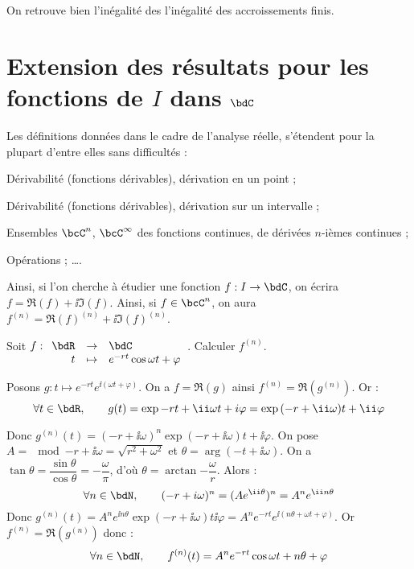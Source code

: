 \documentclass[a4paper,french,bookmarks]{article}
\begin{document}
On retrouve bien l'inégalité des l'inégalité des accroissements finis.
    
\section{Extension des résultats pour les fonctions de $I$ dans $\bdC$}

Les définitions données dans le cadre de l'analyse réelle, s'étendent pour la plupart d'entre elles sans difficultés :

\begin{enumerate}
    \ithand Dérivabilité (fonctions dérivables), dérivation en un point ;
    
    \ithand Dérivabilité (fonctions dérivables), dérivation sur un intervalle ;
    
    \ithand Ensembles $\bcC^n$, $\bcC^\infty$ des fonctions continues, de dérivées $n$-ièmes continues ;
    
    \ithand Opérations ; \dots.
\end{enumerate}

Ainsi, si l'on cherche à étudier une fonction $f : I \to \bdC$, on écrira $f = \Re(f) + \ii \Im(f)$. Ainsi, si $f \in \bcC^n$, on aura $f^{(n)} = \Re(f)^{(n)} + \ii \Im(f)^{(n)}$.

\begin{example}{}{}
    Soit $f : \begin{array}[t]{rcl}
        \bdR &\to& \bdC  \\
        t &\mapsto& e^{-rt}\cos{\omega t + \varphi} 
    \end{array}$. Calculer $f^{(n)}$.
    
    \tcblower
    
    Posons $g : t \mapsto e^{-rt}e^{\ii(\omega t + \varphi)}$. On a $f = \Re(g)$ ainsi $f^{(n)} = \Re(g^{(n)})$. Or :
    \[ \forall t \in \bdR,\qquad g(t) = \exp{-rt + \ii\omega t + i\varphi} = \exp{(-r + \ii\omega)t + \ii \varphi}\]
    
    Donc $g^{(n)}(t) = (-r + \ii\omega)^n \exp{(-r + \ii \omega)t + \ii \varphi}$. On pose $A = \mod{-r + \ii\omega} = \sqrt{r^2 + \omega^2}$ et $\theta = \arg(-t + \ii\omega)$. On a $\tan \theta = \dfrac{\sin \theta}{\cos \theta} = -\dfrac{\omega}{\pi}$, d'où $\theta = \arctan{-\dfrac{\omega}{r}}$. Alors :
    \[ \forall n \in \bdN,\qquad (-r + i\omega)^n = (Ae^{\ii\theta})^n = A^ne^{\ii n\theta}\]
    Donc $g^{(n)}(t) = A^ne^{\ii n\theta}\exp{(-r +\ii \omega)t \ii\varphi} = A^ne^{-rt}e^{\ii(n\theta + \omega t + \varphi)}$. Or $f^{(n)} = \Re(g^{(n)})$ donc :
    \[ \forall n \in \bdN,\qquad f^{(n)}(t) = A^ne^{-rt}\cos{\omega t + n\theta + \varphi}\]
\end{example}
\end{document}
